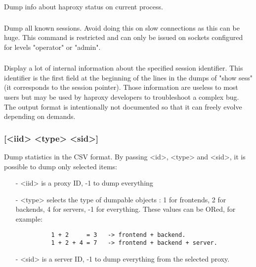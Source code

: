   Dump info about haproxy status on current process.

\subsubsection[show sess]{}

  Dump all known sessions. Avoid doing this on slow connections as this can
  be huge. This command is restricted and can only be issued on sockets
  configured for levels "operator" or "admin".

\subsubsection[show sess <id>]{}

  Display a lot of internal information about the specified session identifier.
  This identifier is the first field at the beginning of the lines in the dumps
  of "show sess" (it corresponds to the session pointer). Those information are
  useless to most users but may be used by haproxy developers to troubleshoot a
  complex bug. The output format is intentionally not documented so that it can
  freely evolve depending on demands.

\subsubsection[show stat]{ [<iid> <type> <sid>]}

  Dump statistics in the CSV format. By passing <id>, <type> and <sid>, it is
  possible to dump only selected items:
  
  \begin{itemize}
  \item[-] <iid> is a proxy ID, -1 to dump everything
  \item[-] <type> selects the type of dumpable objects : 1 for frontends, 2 for
       backends, 4 for servers, -1 for everything. These values can be ORed,
       for example:
       \begin{verbatim}
          1 + 2     = 3   -> frontend + backend.
          1 + 2 + 4 = 7   -> frontend + backend + server.
       \end{verbatim}
  \item[-] <sid> is a server ID, -1 to dump everything from the selected proxy.
  \end{itemize}

